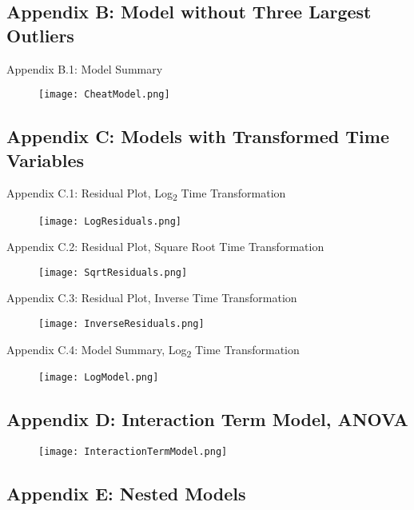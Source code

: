 \documentclass[a4paper, 12pt]{article}
\begin{document}
\begin{spacing}{1.5}
\newpage
\subsection{Appendix B: Model without Three Largest Outliers}

Appendix B.1: Model Summary

\begin{figure}[h]
    \texttt{[image: CheatModel.png]}
\end{figure}

\newpage
\subsection{Appendix C: Models with Transformed Time Variables}

Appendix C.1: Residual Plot, Log\textsubscript{2} Time Transformation

\begin{figure}[h]
    \texttt{[image: LogResiduals.png]}
\end{figure}

Appendix C.2: Residual Plot, Square Root Time Transformation

\begin{figure}[h]
    \texttt{[image: SqrtResiduals.png]}
\end{figure}

\newpage
Appendix C.3: Residual Plot, Inverse Time Transformation

\begin{figure}[h]
    \texttt{[image: InverseResiduals.png]}
\end{figure}

Appendix C.4: Model Summary, Log\textsubscript{2} Time Transformation

\begin{figure}[h]
    \texttt{[image: LogModel.png]}
\end{figure}

\newpage
\subsection{Appendix D: Interaction Term Model, ANOVA}

\begin{figure}[h]
    \texttt{[image: InteractionTermModel.png]}
\end{figure}

\newpage
\subsection{Appendix E: Nested Models}


\end{spacing}
\end{document}
